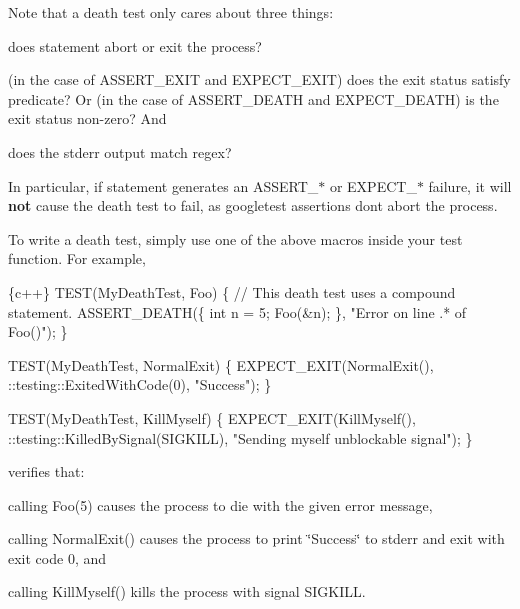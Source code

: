 Note that a death test only cares about three things\+:


\begin{DoxyEnumerate}
\item does {\ttfamily statement} abort or exit the process?
\item (in the case of {\ttfamily A\+S\+S\+E\+R\+T\+\_\+\+E\+X\+IT} and {\ttfamily E\+X\+P\+E\+C\+T\+\_\+\+E\+X\+IT}) does the exit status satisfy {\ttfamily predicate}? Or (in the case of {\ttfamily A\+S\+S\+E\+R\+T\+\_\+\+D\+E\+A\+TH} and {\ttfamily E\+X\+P\+E\+C\+T\+\_\+\+D\+E\+A\+TH}) is the exit status non-\/zero? And
\item does the stderr output match {\ttfamily regex}?
\end{DoxyEnumerate}

In particular, if {\ttfamily statement} generates an {\ttfamily A\+S\+S\+E\+R\+T\+\_\+$\ast$} or {\ttfamily E\+X\+P\+E\+C\+T\+\_\+$\ast$} failure, it will {\bfseries not} cause the death test to fail, as googletest assertions don\textquotesingle{}t abort the process.

To write a death test, simply use one of the above macros inside your test function. For example,


\begin{DoxyCode}
\{c++\}
TEST(MyDeathTest, Foo) \{
  // This death test uses a compound statement.
  ASSERT\_DEATH(\{
    int n = 5;
    Foo(&n);
  \}, "Error on line .* of Foo()");
\}

TEST(MyDeathTest, NormalExit) \{
  EXPECT\_EXIT(NormalExit(), ::testing::ExitedWithCode(0), "Success");
\}

TEST(MyDeathTest, KillMyself) \{
  EXPECT\_EXIT(KillMyself(), ::testing::KilledBySignal(SIGKILL),
              "Sending myself unblockable signal");
\}
\end{DoxyCode}


verifies that\+:


\begin{DoxyItemize}
\item calling {\ttfamily Foo(5)} causes the process to die with the given error message,
\item calling {\ttfamily Normal\+Exit()} causes the process to print {\ttfamily \char`\"{}\+Success\char`\"{}} to stderr and exit with exit code 0, and
\item calling {\ttfamily Kill\+Myself()} kills the process with signal {\ttfamily S\+I\+G\+K\+I\+LL}.
\end{DoxyItemize}

